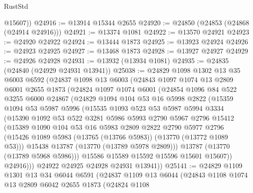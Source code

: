 \begin{lexlean}{RustStd}
\begin{coremodule}
        @15607))
@24916 := @13914 @15344 @2655
@24920 := @24850 (@24853 (@24868 (@24914 @24916)))
@24921 := @13374 @1081
@24922 := @13570 @24921
@24923 := @24920 @24922
@24924 := @13444 @1873
@24925 := @13923 @24924
@24926 := @24923 @24925
@24927 := @13468 @1873
@24928 := @13927 @24927
@24929 := @24926 @24928
@24931 := @13932 (@13934 @1081)
@24935 := @24835 (@24840 (@24929 @24931 @13941))
@25038 := @24829
    @1098
    @1302
    @13
    @35
    @6003
    @6592
    (@24837
      @1098
      @13
      @6003
      (@24843
        @1097
        @1074
        @13
        @2809
        @6001
        @2655
        @1873
        (@24824
          @1097
          @1074
          @6001
          (@24854
            @1096
            @84
            @522
            @3255
            @6000
            @24867
            (@24829
              @1094
              @104
              @53
              @16
              @5998
              @2822
              (@15359
                @1094
                @53
                @5987
                @5996
                (@15535
                  @1093
                  @523
                  @53
                  @5987
                  @5994
                  @3334
                  (@15390
                    @1092
                    @53
                    @522
                    @3281
                    @5986
                    @5993
                    @2790
                    @5967
                    @2796
                    @15412
                    (@15389
                      @1090
                      @104
                      @53
                      @16
                      @5983
                      @2809
                      @2822
                      @2790
                      @5977
                      @2796
                      (@15426 @1089 @5983 (@13765 (@13766 @5983)) (@13770 (@13772 @1089 @53)))
                      @15438
                      @13787
                      (@13770 (@13789 @5978 @2809)))
                    @13787
                    (@13770 (@13789 @5968 @5986)))
                  @15586
                  @15589
                  @15592
                  @15596
                  @15601
                  @15607))
              @24916)))
        @24922
        @24925
        @24928
        @24931
        @13941))
@25141 := @24829
    @1109
    @1301
    @13
    @34
    @6044
    @6591
    (@24837
      @1109
      @13
      @6044
      (@24843
        @1108
        @1074
        @13
        @2809
        @6042
        @2655
        @1873
        (@24824
          @1108

\end{coremodule}
\end{lexlean}
